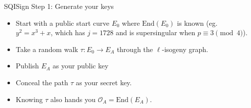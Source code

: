 \documentclass[10pt,aspectratio=169]{beamer}
\begin{document}
\begin{frame}{SQISign Step 1: Generate your keys}
  \begin{itemize}[<+->]
    \item Start with a public start curve $E_0$ where $\text{End}(E_0)$ is known
          (eg.\ $y^2 = x^3 + x$, which has $j = 1728$ and is supersingular when $p \equiv 3 \pmod 4$).
    \item Take a \alert{random walk} $\tau: E_0 \to E_A$ through the $\ell$-isogeny graph.
    \item Publish $E_A$ as your \alert{public key} 
    \item Conceal the path $\tau$ as your \alert{secret key}.
    \item Knowing $\tau$ also hands you $\mathcal{O}_A=\text{End}(E_A)$.
  \end{itemize}
  \vspace{0.4em}
  \begin{center}
  \end{center}
\end{frame}
\end{document}
